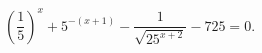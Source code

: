 \begin{ex}[type=equation]
	\begin{condition}
		 $\left(\dfrac{1}{5}\right)^x+  5^{ -(x + 1)} - \dfrac{1}{\sqrt{25 ^{x + 2}}} - 725 = 0.$
	\end{condition}
\end{ex}